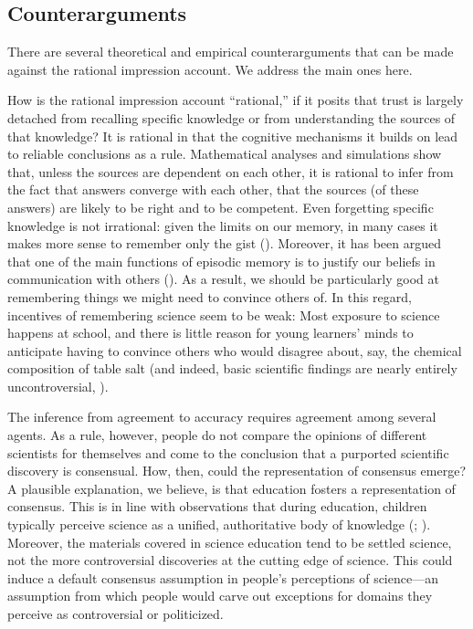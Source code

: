 \documentclass[
  man,
  floatsintext,
  longtable,
  nolmodern,
  notxfonts,
  notimes,
  colorlinks=true,linkcolor=blue,citecolor=blue,urlcolor=blue]{apa7}
\begin{document}
\subsection{Counterarguments}\label{counterarguments}

There are several theoretical and empirical counterarguments that can be
made against the rational impression account. We address the main ones
here.

How is the rational impression account ``rational,'' if it posits that
trust is largely detached from recalling specific knowledge or from
understanding the sources of that knowledge? It is rational in that the
cognitive mechanisms it builds on lead to reliable conclusions as a
rule. Mathematical analyses and simulations show that, unless the
sources are dependent on each other, it is rational to infer from the
fact that answers converge with each other, that the sources (of these
answers) are likely to be right and to be competent. Even forgetting
specific knowledge is not irrational: given the limits on our memory, in
many cases it makes more sense to remember only the gist
(). Moreover,
it has been argued that one of the main functions of episodic memory is
to justify our beliefs in communication with others
(). As a
result, we should be particularly good at remembering things we might
need to convince others of. In this regard, incentives of remembering
science seem to be weak: Most exposure to science happens at school, and
there is little reason for young learners' minds to anticipate having to
convince others who would disagree about, say, the chemical composition
of table salt (and indeed, basic scientific findings are nearly entirely
uncontroversial,
).

The inference from agreement to accuracy requires agreement among
several agents. As a rule, however, people do not compare the opinions
of different scientists for themselves and come to the conclusion that a
purported scientific discovery is consensual. How, then, could the
representation of consensus emerge? A plausible explanation, we believe,
is that education fosters a representation of consensus. This is in line
with observations that during education, children typically perceive
science as a unified, authoritative body of knowledge
(; ). Moreover, the materials covered in science education tend to be
settled science, not the more controversial discoveries at the cutting
edge of science. This could induce a default consensus assumption in
people's perceptions of science---an assumption from which people would
carve out exceptions for domains they perceive as controversial or
politicized.
\end{document}
